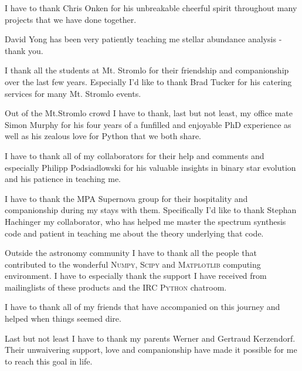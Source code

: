 I have to thank Chris Onken for his unbreakable cheerful spirit throughout many projects that we have done together.

David Yong has been very patiently teaching me stellar abundance analysis - thank you.

I thank all the students at Mt. Stromlo for their friendship and companionship over the last few years. Especially I'd like to thank Brad Tucker for his catering services for many Mt. Stromlo events. 

Out of the Mt.Stromlo crowd I have to thank, last but not least, my office mate Simon Murphy for his four years of a funfilled and enjoyable PhD experience as well as his zealous love for Python that we both share.

I have to thank all of my collaborators for their help and comments and especially Philipp Podsiadlowski for his valuable insights in binary star evolution and his patience in teaching me.

I have to thank the MPA Supernova group for their hospitality and companionship during my stays with them. Specifically I'd like to thank Stephan Hachinger my collaborator, who has helped me master the spectrum synthesis code and patient in teaching me about the theory underlying that code.

Outside the astronomy community I have to thank all the people that contributed to the wonderful \textsc{Numpy}, \textsc{Scipy} and \textsc{Matplotlib} computing environment. I have to especially thank the support I have received from mailinglists of these products and the IRC \textsc{Python} chatroom.

I have to thank all of my friends that have accompanied on this journey and helped when things seemed dire.

Last but not least I have to thank my parents Werner and Gertraud Kerzendorf. Their unwaivering support, love and companionship have made it possible for me to reach this goal in life. 


